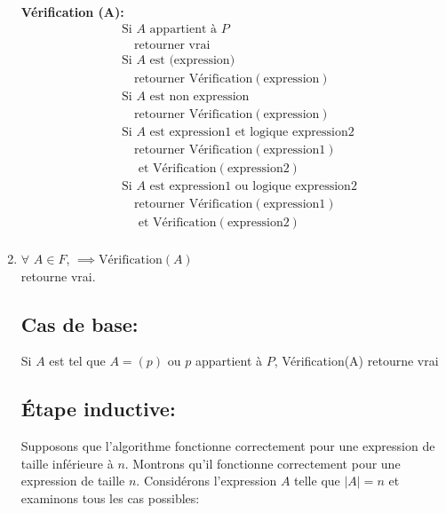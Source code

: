 \documentclass[16pt]{report}
\begin{document}
\begin{multicols*}{2}
\begin{enumerate}
            \textbf{Vérification (A):}
            \begin{align*}
                &\text{Si } A \text{ appartient à } P \\
                &\quad \text{retourner vrai} \\
                &\text{Si } A \text{ est (expression)} \\
                &\quad \text{retourner } \text{Vérification}(\text{expression}) \\
                &\text{Si } A \text{ est non expression} \\
                &\quad \text{retourner } \text{Vérification}(\text{expression}) \\
                &\text{Si } A \text{ est expression1 et logique expression2} \\
                &\quad \text{retourner } \text{Vérification}(\text{expression1}) \\ & \quad \text{ et } 
                \text{Vérification}(\text{expression2}) \\
                &\text{Si } A \text{ est expression1 ou logique expression2} \\
                &\quad \text{retourner } \text{Vérification}(\text{expression1})  \\ & \quad \text{ et } 
                \text{Vérification}(\text{expression2}) \\
            \end{align*}
            \item
           $\forall$ \(A \in F\), \(\implies\text{Vérification}(A)\) \\ retourne vrai.
        \subsection*{Cas de base:}
        Si $A$ est tel que $A = (p)$ ou $p$ appartient à $P$, Vérification(A) retourne vrai

        \subsection*{Étape inductive:}
            Supposons que l'algorithme fonctionne correctement pour une expression de taille inférieure à \(n\). Montrons qu'il fonctionne correctement pour une expression de taille \(n\). Considérons l'expression \(A\) telle que \(|A| = n\) et examinons tous les cas possibles:


\end{enumerate}
\end{multicols*}
\end{document}
